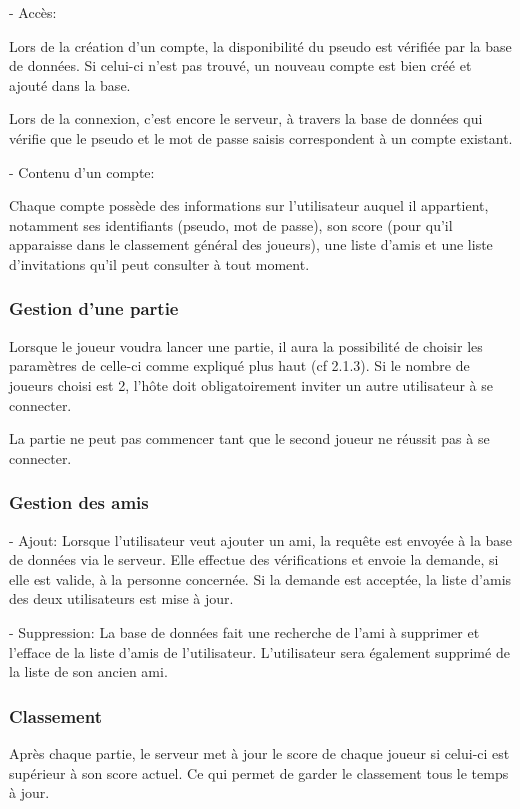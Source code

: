 \documentclass[a4paper,12pt]{article}
\begin{document}
- Accès:

Lors de la création d'un compte, la disponibilité du pseudo est vérifiée par la base de données. Si celui-ci n'est pas trouvé, un nouveau compte est bien créé et ajouté dans la base.

Lors de la connexion, c'est encore le serveur, à travers la base de données qui vérifie que le pseudo et le mot de passe saisis correspondent à un compte existant.

- Contenu d'un compte:

Chaque compte possède des informations sur l'utilisateur auquel il appartient, notamment ses identifiants (pseudo, mot de passe), son score (pour qu'il apparaisse dans le classement général des joueurs), une liste d'amis et une liste d'invitations qu'il peut consulter à tout moment.

\subsubsection{Gestion d'une partie}

Lorsque le joueur voudra lancer une partie,
il aura la possibilité de choisir les paramètres de celle-ci comme expliqué plus haut (cf 2.1.3). Si le nombre de joueurs choisi est 2, l'hôte doit obligatoirement inviter un autre utilisateur à se connecter.

La partie ne peut pas commencer tant que le second joueur ne réussit pas à se connecter.
\subsubsection{Gestion des amis}

- Ajout: Lorsque l'utilisateur veut ajouter un ami, la requête est envoyée à la base de données via le serveur. Elle effectue des vérifications et envoie la demande, si elle est valide, à la personne concernée. Si la demande est acceptée, la liste d'amis des deux utilisateurs est mise à jour.

- Suppression: La base de données fait une recherche de l'ami à supprimer et l'efface de la liste d'amis de l'utilisateur. L'utilisateur sera également supprimé de la liste de son ancien ami.

\subsubsection{Classement}

Après chaque partie, le serveur met à jour le score de chaque joueur si celui-ci est supérieur à son score actuel. 
Ce qui permet de garder le classement tous le temps à jour. 
\end{document}
